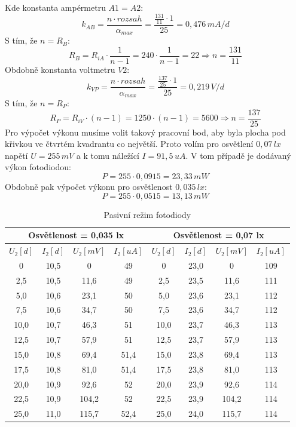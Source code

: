 \documentclass[12pt]{article} %
\begin{document}
Kde konstanta ampérmetru $A1 = A2$:
\begin{equation}
k_{AB} = \frac{n\cdot rozsah}{\alpha_{max}} = \frac{\frac{131}{11}\cdot 1}{25} = 0,476 \, mA/d
\end{equation}
S tím, že $n = R_B$:
\begin{equation}
R_B = R_{iA}\cdot \frac{1}{n-1} = 240\cdot \frac{1}{n-1} = 22 \Rightarrow n = \frac{131}{11}
\end{equation}
Obdobně konstanta voltmetru $V2$:
\begin{equation}
k_{VP} = \frac{n\cdot rozsah}{\alpha_{max}} = \frac{\frac{137}{25}\cdot 1}{25} = 0,219 \, V/d
\end{equation}
S tím, že $n = R_P$:
\begin{equation}
R_P = R_{iV}\cdot (n-1) = 1250\cdot (n-1) = 5600 \Rightarrow n = \frac{137}{25}
\end{equation}
Pro výpočet výkonu musíme volit takový pracovní bod, aby byla plocha pod křivkou ve čtvrtém kvadrantu co největší. Proto volím pro osvětlení $0,07\,lx$ napětí $U = 255\,mV$ a k tomu náležící $I = 91,5\,uA$.
V tom případě je dodávaný výkon fotodiodou:
\begin{equation}
P = 255 \cdot 0,0915 = 23,33\,mW
\end{equation}
Obdobně pak výpočet výkonu pro osvětlenost $0,035\,lx$:
\begin{equation}
P = 255 \cdot 0,0515 = 13,13\,mW
\end{equation}

\begin{table}[H]
\caption{Pasivní režim fotodiody}
\begin{tabular}{|c|c|c|c|c|c|c|c|}
\hline 
\multicolumn{4}{|c|}{Osvětlenost = 0,035 lx} & \multicolumn{4}{|c|}{Osvětlenost = 0,07 lx} \\ 
\hline 
$U_2 [d]$ & $I_2 [d]$ & $U_2 [mV]$ & $I_2 [uA]$ & $U_2 [d]$ & $I_2 [d]$ & $U_2 [mV]$ & $I_2 [uA]$ \\ 
\hline 
0 & 10,5 & 0 & 49 & 0 & 23,0 & 0 & 109 \\ 
\hline 
2,5 & 10,5 & 11,6 & 49 & 2,5 & 23,5 & 11,6 & 111 \\ 
\hline 
5,0 & 10,6 & 23,1 & 50 & 5,0 & 23,6 & 23,1 & 112 \\ 
\hline 
7,5 & 10,6 & 34,7 & 50 & 7,5 & 23,6 & 34,7 & 112 \\ 
\hline 
10,0 & 10,7 & 46,3 & 51 & 10,0 & 23,7 & 46,3 & 113 \\ 
\hline 
12,5 & 10,7 & 57,9 & 51 & 12,5 & 23,7 & 57,9 & 113 \\ 
\hline 
15,0 & 10,8 & 69,4 & 51,4 & 15,0 & 23,8 & 69,4 & 113 \\ 
\hline 
17,5 & 10,8 & 81,0 & 51,4 & 17,5 & 23,8 & 81,0 & 113 \\ 
\hline 
20,0 & 10,9 & 92,6 & 52 & 20,0 & 23,9 & 92,6 & 114 \\ 
\hline 
22,5 & 10,9 & 104,2 & 52 & 22,5 & 23,9 & 104,2 & 114 \\ 
\hline 
25,0 & 11,0 & 115,7 & 52,4 & 25,0 & 24,0 & 115,7 & 114 \\ 
\hline 
\end{tabular} 
\end{table}
\end{document}
